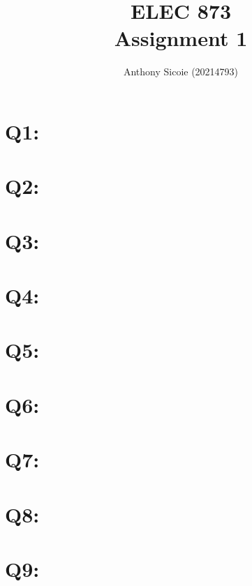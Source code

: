 \documentclass[11pt]{article}
\title{%
  ELEC 873 \\
Assignment 1}
\author{Anthony Sicoie (20214793)}
\begin{document}
\maketitle


\section*{Q1:}

\section*{Q2:}

\section*{Q3:}

\section*{Q4:}

\section*{Q5:}

\section*{Q6:}

\section*{Q7:}

\section*{Q8:}

\section*{Q9:}


\newpage

% 
% 
\end{document}
